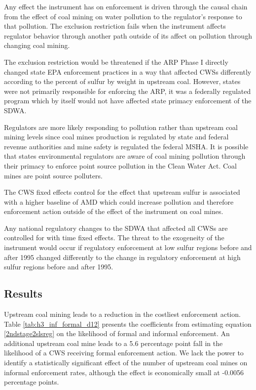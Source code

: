 \documentclass{article}
\begin{document}
Any effect the instrument has on enforcement is driven through the causal chain from the effect of coal mining on water pollution to the regulator's response to that pollution. The exclusion restriction fails when the instrument affects regulator behavior through another path outside of its affect on pollution through changing coal mining.

The exclusion restriction would be threatened if the ARP Phase I directly changed state EPA enforcement practices in a way that affected CWSs differently according to the percent of sulfur by weight in upstream coal. However, states were not primarily responsible for enforcing the ARP, it was a federally regulated program which by itself would not have affected state primacy enforcement of the SDWA.

Regulators are more likely responding to pollution rather than upstream coal mining levels since coal mines production is regulated by state and federal revenue authorities and mine safety is regulated the federal MSHA. It is possible that states environmental regulators are aware of coal mining pollution through their primacy to enforce point source pollution in the Clean Water Act. Coal mines are point source polluters.

The CWS fixed effects control for the effect that upstream sulfur is associated with a higher baseline of AMD which could increase pollution and therefore enforcement action outside of the effect of the instrument on coal mines.

Any national regulatory changes to the SDWA that affected all CWSs are controlled for with time fixed effects. The threat to the exogeneity of the instrument would occur if regulatory enforcement at low sulfur regions before and after 1995 changed differently to the change in regulatory enforcement at high sulfur regions before and after 1995.

\subsection{Results}

Upstream coal mining leads to a reduction in the costliest enforcement action. Table \ref{tab:h3_inf_formal_d12} presents the coefficients from estimating equation \ref{2ndstage2slsreg} on the likelihood of formal and informal enforcement. An additional upstream coal mine leads to a 5.6 percentage point fall in the likelihood of a CWS receiving formal enforcement action. We lack the power to identify a statistically significant effect of the number of upstream coal mines on informal enforcement rates, although the effect is economically small at -0.0056 percentage points.
\end{document}
